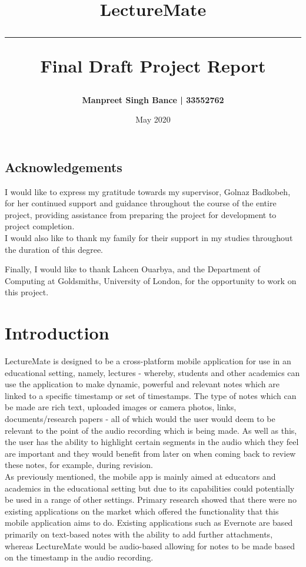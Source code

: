 \documentclass{report}
\title{\textbf{LectureMate} \vspace{0.5cm} \hrule \vspace{0.5cm}Final Draft Project Report}
\author{\textbf{Manpreet Singh Bance | 33552762}}
\date{May 2020}
\begin{document}
\maketitle

\tableofcontents
\newpage

\thispagestyle{empty}
\listoffigures
 
\listoftables

\newpage
\section*{Acknowledgements}

I would like to express my gratitude towards my supervisor, Golnaz Badkobeh, for her continued support and guidance throughout the course of the entire project, providing assistance from preparing the project for development to project completion.\\

I would also like to thank my family for their support in my studies throughout the duration of this degree.  \\

\par Finally, I would like to thank Lahcen Ouarbya, and the Department of Computing at Goldsmiths, University of London, for the opportunity to work on this project.

\chapter{Introduction}
LectureMate is designed to be a cross-platform mobile application for use in an educational setting, namely, lectures - whereby, students and other academics can use the application to make dynamic, powerful and relevant notes which are linked to a specific timestamp or set of timestamps. The type of notes which can be made are rich text, uploaded images or camera photos, links, documents/research papers - all of which would the user would deem to be relevant to the point of the audio recording which is being made. As well as this, the user has the ability to highlight certain segments in the audio which they feel are important and they would benefit from later on when coming back to review these notes, for example, during revision.\\

As previously mentioned, the mobile app is mainly aimed at educators and academics in the educational setting but due to its capabilities could potentially be used in a range of other settings. Primary research showed that there were no existing applications on the market which offered the functionality that this mobile application aims to do. Existing applications such as Evernote are based primarily on text-based notes with the ability to add further attachments, whereas LectureMate would be audio-based allowing for notes to be made based on the timestamp in the audio recording.\\
\end{document}
